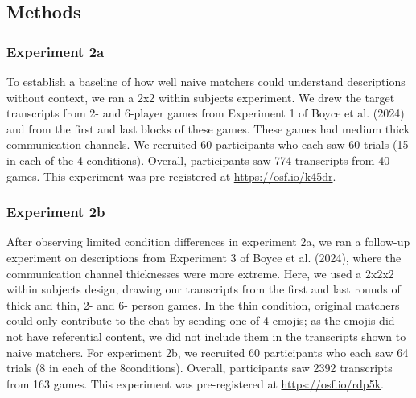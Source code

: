 \documentclass[10pt, letterpaper]{article}
\begin{document}
\subsection{Methods}\label{methods-1}

\subsubsection{Experiment 2a}\label{experiment-2a}

To establish a baseline of how well naive matchers could understand
descriptions without context, we ran a 2x2 within subjects experiment.
We drew the target transcripts from 2- and 6-player games from
Experiment 1 of Boyce et al. (2024) and from the first and last blocks
of these games. These games had medium thick communication channels. We
recruited 60 participants who each saw 60 trials (15 in each of the 4
conditions). Overall, participants saw 774 transcripts from 40 games.
This experiment was pre-registered at \url{https://osf.io/k45dr}.

\subsubsection{Experiment 2b}\label{experiment-2b}

After observing limited condition differences in experiment 2a, we ran a
follow-up experiment on descriptions from Experiment 3 of Boyce et al.
(2024), where the communication channel thicknesses were more extreme.
Here, we used a 2x2x2 within subjects design, drawing our transcripts
from the first and last rounds of thick and thin, 2- and 6- person
games. In the thin condition, original matchers could only contribute to
the chat by sending one of 4 emojis; as the emojis did not have
referential content, we did not include them in the transcripts shown to
naive matchers. For experiment 2b, we recruited 60 participants who each
saw 64 trials (8 in each of the 8conditions). Overall, participants saw
2392 transcripts from 163 games. This experiment was pre-registered at
\url{https://osf.io/rdp5k}.
\end{document}
